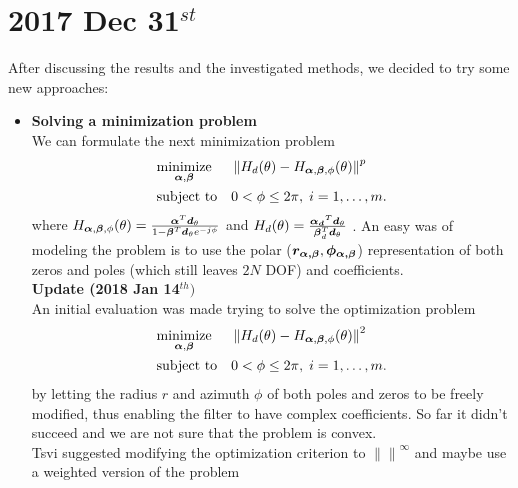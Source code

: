 \documentclass[12pt]{article}
\begin{document}
\section{2017 Dec 31$^{st}$}
After discussing the results and the investigated methods, we decided to try some new approaches:
\begin{itemize}
\item {
\textbf{Solving a minimization problem}\\
We can formulate the next minimization problem 
\begin{equation*}
\begin{aligned}
& \underset{\boldsymbol{\alpha},\boldsymbol{\beta}}{\text{minimize}}
& & 
\left\lVert 
H_{d}(\theta) - H_{\boldsymbol{\alpha},\boldsymbol{\beta},\phi}(\theta)
\right\rVert^p
\\
& \text{subject to}
& & 0 < \phi \leq 2\pi, \; i = 1, \ldots, m.
\end{aligned}
\end{equation*}
where 
$ 
H_{\boldsymbol{\alpha},\boldsymbol{\beta},\phi}(\theta) =  
\frac
{
\boldsymbol{\alpha}^{T}
\boldsymbol{d}_{\theta}
}
{
1
-
\boldsymbol{\beta}^{T}\boldsymbol{d}_{\theta}
e^{-j\phi}
}
$
and 
$ 
H_{d}(\theta) =  
\frac
{
\boldsymbol{\alpha_{d}}^{T}
\boldsymbol{d}_{\theta}
}
{
\boldsymbol{\beta}_{d}^{T}\boldsymbol{d}_{\theta}
}
$
}. 
An easy was of modeling the problem is to use the polar ($\boldsymbol{r_{\boldsymbol{\alpha},\boldsymbol{\beta}}},\boldsymbol{\phi_{\boldsymbol{\alpha},\boldsymbol{\beta}}}$) representation of both zeros and poles (which still leaves $ 2N $ DOF) and coefficients.
\\
\textbf{Update (2018 Jan 14$^{th})$}
\\
An initial evaluation was made trying to solve the optimization problem 
\begin{equation*}
\begin{aligned}
& \underset{\boldsymbol{\alpha},\boldsymbol{\beta}}{\text{minimize}}
& & 
\left\lVert 
H_{d}(\theta) - H_{\boldsymbol{\alpha},\boldsymbol{\beta},\phi}(\theta)
\right\rVert^2
\\
& \text{subject to}
& & 0 < \phi \leq 2\pi, \; i = 1, \ldots, m.
\end{aligned}
\end{equation*}
by letting the radius $ r $ and azimuth $ \phi $ of both poles and zeros to be freely modified, thus enabling the filter to have complex coefficients. So far it didn't succeed and we are not sure that the problem is convex.
\\
Tsvi suggested modifying the optimization criterion to $ \left\lVert \right\rVert^\infty $ and maybe use a weighted version of the problem 

\end{itemize}
\end{document}

